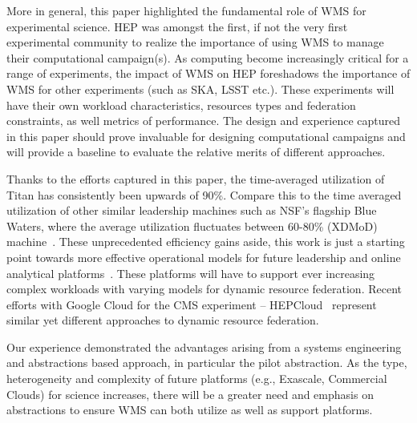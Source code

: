 More in general, this paper highlighted the fundamental role of WMS for
experimental science. HEP was amongst the first, if not the very first
experimental community to realize the importance of using WMS to manage their
computational campaign(s). As computing become increasingly critical for a range
of experiments, the impact of WMS on HEP foreshadows the importance of WMS for
other experiments (such as SKA, LSST etc.). %
These experiments will have their own workload characteristics, resources types
and federation constraints, as well metrics of performance.  The design and
experience captured in this paper should prove invaluable for designing
computational campaigns and will provide a baseline to evaluate the relative
merits of different approaches.

Thanks to the efforts captured in this paper, the time-averaged utilization of
Titan has consistently been upwards of 90\%. Compare this to the time averaged
utilization of other similar leadership machines such as NSF's flagship Blue
Waters, where the average utilization fluctuates between 60-80\% (XDMoD)
machine~\cite{bw-sucks}. These
unprecedented efficiency gains aside, this work is just a starting point towards
more effective operational models for future leadership and online analytical
platforms~\cite{foap-url}. These platforms will have to support ever increasing
complex workloads with varying models for dynamic resource federation. Recent
efforts with Google Cloud for the CMS experiment --
HEPCloud~\cite{hepcloud,googlehep} represent similar yet different approaches
to dynamic resource federation.

Our experience demonstrated the advantages arising from a  systems engineering
and abstractions based approach, in particular the pilot abstraction. As the
type, heterogeneity and complexity of future platforms  (e.g., Exascale,
Commercial Clouds) for science increases, there will be a greater need and
emphasis on abstractions to ensure WMS can both utilize as well as support
platforms.
